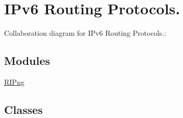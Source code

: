\hypertarget{group__ipv6Routing}{}\section{I\+Pv6 Routing Protocols.}
\label{group__ipv6Routing}
Collaboration diagram for I\+Pv6 Routing Protocols.\+:
\subsection*{Modules}
\begin{DoxyCompactItemize}
\item 
\hyperlink{group__ripng}{R\+I\+Png}
\end{DoxyCompactItemize}
\subsection*{Classes}
